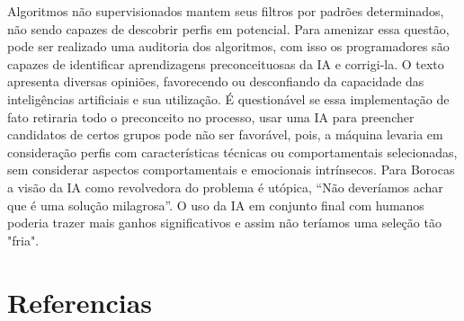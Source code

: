 \documentclass[11pt,twocolumn]{article}
\begin{document}
Algoritmos não supervisionados mantem seus filtros por padrões determinados, não sendo capazes de descobrir perfis em potencial. Para amenizar essa questão, pode ser realizado uma auditoria dos algoritmos, com isso os programadores são capazes de identificar aprendizagens preconceituosas da IA e corrigi-la.
O texto apresenta diversas opiniões, favorecendo ou desconfiando da capacidade das inteligências artificiais e sua utilização.
É questionável se essa implementação de fato retiraria todo o preconceito no processo, usar uma IA para preencher candidatos de certos grupos pode não ser favorável, pois, a máquina levaria em consideração perfis com características técnicas ou comportamentais selecionadas, sem considerar aspectos comportamentais e emocionais intrínsecos. Para Borocas a visão da IA como revolvedora do problema é utópica, “Não deveríamos achar que é uma solução milagrosa”.
O uso da IA em conjunto final com humanos poderia trazer mais ganhos significativos e assim não teríamos uma seleção tão "fria". 


\section{Referencias}

%
%
\end{document}
